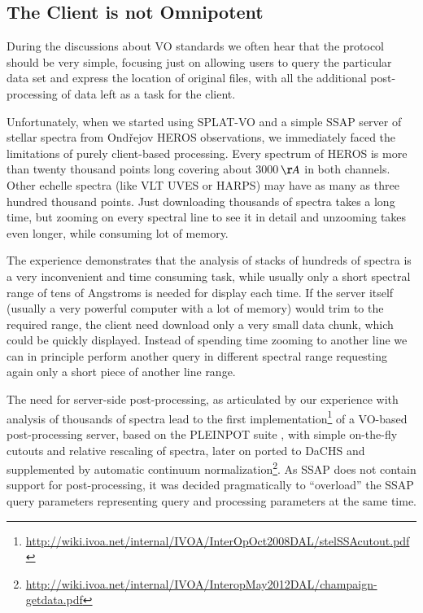 \documentclass[final,authoryear,5p,times,twocolumn]{elsarticle}
\begin{document}
\subsection{The Client is not Omnipotent}

During the discussions about VO standards we often hear that the
protocol should be very simple, focusing just on allowing users to
query the particular data set and express the location of original
files, with all the additional post-processing of data left as a task
for the client.

Unfortunately, when we started using SPLAT-VO and a simple SSAP server
of stellar spectra from Ond\v{r}ejov HEROS observations, we
immediately faced the limitations of purely client-based
processing. Every spectrum of HEROS is more than twenty thousand
points long covering about 3000\,$\AA$ in both channels. Other echelle
spectra (like VLT UVES or HARPS) may have as many as three hundred
thousand points. Just downloading thousands of spectra takes a long
time, but zooming on every spectral line to see it in detail and
unzooming takes even longer, while consuming lot of memory.

The experience demonstrates that the analysis of stacks of hundreds of
spectra is a very inconvenient and time consuming task, while usually
only a short spectral range of tens of Angstroms is needed for display
each time.  If the server itself (usually a very powerful computer
with a lot of memory) would trim to the required range, the client
need download only a very small data chunk, which could be quickly
displayed. Instead of spending time zooming to another line we can in
principle perform another query in different spectral range requesting
again only a short piece of another line range.

The need for server-side post-processing, as articulated by our
experience with analysis of thousands of spectra lead to the first
implementation\footnote{\url{http://wiki.ivoa.net/internal/IVOA/InterOpOct2008DAL/stelSSAcutout.pdf}}
of a VO-based post-processing server, based on the PLEINPOT suite
\citep{2005ASPC..347..385C}, with simple on-the-fly cutouts and
relative rescaling of spectra, later on ported to DaCHS and
supplemented by automatic continuum
normalization\footnote{\url{http://wiki.ivoa.net/internal/IVOA/InteropMay2012DAL/champaign-getdata.pdf}}.
As SSAP does not contain support for post-processing, it was decided
pragmatically to ``overload'' the SSAP query parameters representing
query and processing parameters at the same time.
\end{document}
